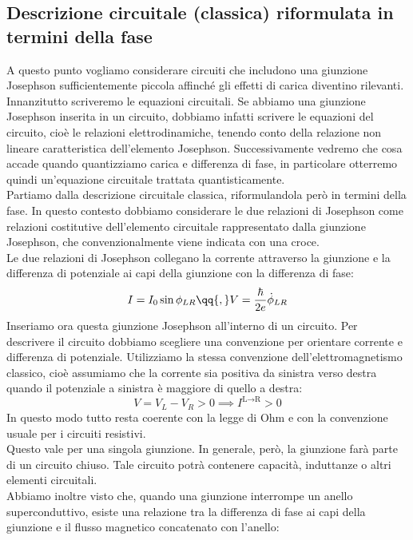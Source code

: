 \subsection{Descrizione circuitale (classica) riformulata in termini della fase}
A questo punto vogliamo considerare circuiti che includono una giunzione Josephson sufficientemente piccola affinché gli effetti di carica diventino rilevanti.\\
Innanzitutto scriveremo le equazioni circuitali. Se abbiamo una giunzione Josephson inserita in un circuito, dobbiamo infatti scrivere le equazioni del circuito, cioè le relazioni elettrodinamiche, tenendo conto della relazione non lineare caratteristica dell'elemento Josephson. Successivamente vedremo che cosa accade quando quantizziamo carica e differenza di fase, in particolare otterremo quindi un'equazione circuitale trattata quantisticamente.\\
Partiamo dalla descrizione circuitale classica, riformulandola però in termini della fase. In questo contesto dobbiamo considerare le due relazioni di Josephson come relazioni costitutive dell'elemento circuitale rappresentato dalla giunzione Josephson, che convenzionalmente viene indicata con una croce.\\
Le due relazioni di Josephson collegano la corrente attraverso la giunzione e la differenza di potenziale ai capi della giunzione con la differenza di fase:
\begin{equation*}
    I=I_0 \sin{\phi_{LR}}
    \qq{,}
    V=\frac{\hbar}{2e}\dot{\phi}_{LR}
\end{equation*}
Inseriamo ora questa giunzione Josephson all'interno di un circuito. Per descrivere il circuito dobbiamo scegliere una convenzione per orientare corrente e differenza di potenziale. Utilizziamo la stessa convenzione dell'elettromagnetismo classico, cioè assumiamo che la corrente sia positiva da sinistra verso destra quando il potenziale a sinistra è maggiore di quello a destra:
\begin{equation*}
    V=V_L-V_R>0
    \implies
    I^{\text{L}\to\text{R}}>0
\end{equation*}
In questo modo tutto resta coerente con la legge di Ohm e con la convenzione usuale per i circuiti resistivi.\\
Questo vale per una singola giunzione. In generale, però, la giunzione farà parte di un circuito chiuso. Tale circuito potrà contenere capacità, induttanze o altri elementi circuitali.\\
Abbiamo inoltre visto che, quando una giunzione interrompe un anello superconduttivo, esiste una relazione tra la differenza di fase ai capi della giunzione e il flusso magnetico concatenato con l'anello:
